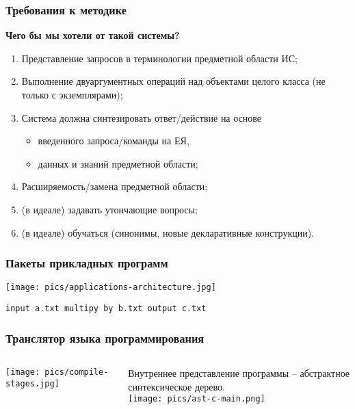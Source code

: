 \documentclass[10pt]{beamer}
\begin{document}
\begin{frame}
  \frametitle{Требования к методике}
  \textbf{Чего бы мы хотели от такой системы?}
  \begin{enumerate}
  \item Представление запросов в терминологии предметной области ИС;
  \item Выполнение двуаргументных операций над объектами целого класса (не только с экземплярами);
  \item Система должна синтезировать ответ/действие на основе
    \begin{itemize}
    \item введенного запроса/команды на ЕЯ,
    \item данных и знаний предметной области;
    \end{itemize}
  \item Расширяемость/замена предметной области;
  \item (в идеале) задавать утончающие вопросы;
  \item (в идеале) обучаться (синонимы, новые декларативные конструкции).
  \end{enumerate}
\end{frame}

\begin{frame}
  \frametitle{Пакеты прикладных программ}
  \begin{center}
    \texttt{[image: pics/applications-architecture.jpg]}
  \end{center}
  \texttt{input  a.txt multipy by b.txt output c.txt}
\end{frame}


\begin{frame}
  \frametitle{Транслятор языка программирования}
   \begin{columns}
     \begin{column}{0.5\textwidth}
       \texttt{[image: pics/compile-stages.jpg]}
     \end{column}
     \begin{column}{0.5\textwidth}
       Внутреннее представление программы -- абстрактное синтексическое дерево.\\[1em]
       \texttt{[image: pics/ast-c-main.png]}
     \end{column}
   \end{columns}
 \end{frame}
\end{document}
